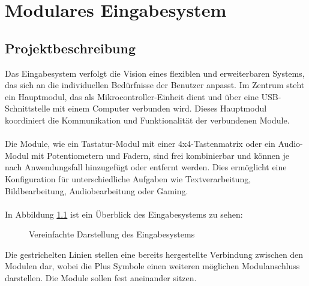 \chapter{Modulares Eingabesystem}
\section{Projektbeschreibung}\label{sec:vision}
Das Eingabesystem verfolgt die Vision eines flexiblen und erweiterbaren Systems, das sich an die individuellen Bedürfnisse der Benutzer anpasst. Im Zentrum steht ein Hauptmodul, das als Mikrocontroller-Einheit dient und über eine USB-Schnittstelle mit einem Computer verbunden wird. Dieses Hauptmodul koordiniert die Kommunikation und Funktionalität der verbundenen Module.
\\
\\
Die Module, wie ein Tastatur-Modul mit einer 4x4-Tastenmatrix oder ein Audio-Modul mit Potentiometern und Fadern, sind frei kombinierbar und können je nach Anwendungsfall hinzugefügt oder entfernt werden. Dies ermöglicht eine Konfiguration für unterschiedliche Aufgaben wie Textverarbeitung, Bildbearbeitung, Audiobearbeitung oder Gaming.
\\
\\
In Abbildung \ref{vision} ist ein Überblick des Eingabesystems zu sehen:
\begin{figure}[H]
    \centering    
    \caption{Vereinfachte Darstellung des Eingabesystems}
    \label{vision}
\end{figure}
\noindent Die gestrichelten Linien stellen eine bereits hergestellte Verbindung zwischen den Modulen dar, wobei die \glqq Plus\grqq{} Symbole einen weiteren möglichen Modulanschluss darstellen. Die Module sollen fest aneinander sitzen.

